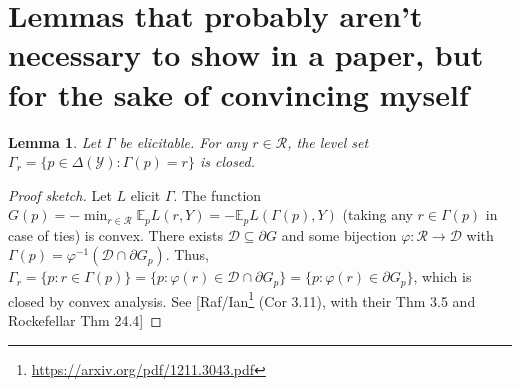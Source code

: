\documentclass[12pt]{article}
\newcommand{\D}{\mathcal{D}}
\newcommand{\E}{\mathbb{E}}
\newcommand{\R}{\mathcal{R}}
\newcommand{\Y}{\mathcal{Y}}
\newtheorem{lemma}{Lemma}
\newtheorem{definition}{Definition}
\begin{document}
\section{Lemmas that probably aren't necessary to show in a paper, but for the sake of convincing myself}

\begin{lemma}\label{lem:closed-level-sets}
	Let $\Gamma$ be elicitable.
	For any $r\in\R$, the level set $\Gamma_r = \{ p \in \Delta(\Y) : \Gamma(p) = r \}$ is closed.
\end{lemma}
\begin{proof}[Proof sketch]
	Let $L$ elicit $\Gamma$.
	The function $G(p) = -\min_{r\in\R} \E_p L(r,Y) = -\E_p L(\Gamma(p),Y)$ (taking any $r\in\Gamma(p)$ in case of ties) is convex.
	There exists $\D \subseteq \partial G$ and some bijection $\varphi : \R \to \D$ with $\Gamma(p) = \varphi^{-1}(\D\cap \partial G_p)$.
	Thus, $\Gamma_r = \{p : r\in\Gamma(p)\} = \{p : \varphi(r) \in \D\cap\partial G_p\} = \{p : \varphi(r) \in \partial G_p\}$, which is closed by convex analysis.
	See [Raf/Ian\footnote{\url{https://arxiv.org/pdf/1211.3043.pdf}} (Cor 3.11), with their Thm 3.5 and Rockefellar Thm 24.4]  
\end{proof}


\end{document}
